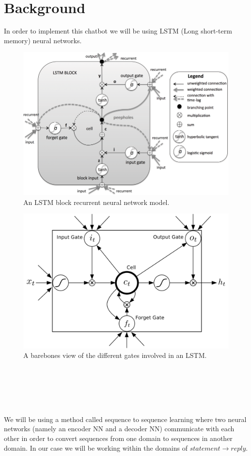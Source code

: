 \documentclass[titlepage]{article}
\newcommand\tab[1][1cm]{\hspace*{#1}}
\begin{document}
\section{Background}
In order to implement this chatbot we will be using LSTM (Long short-term memory) neural networks.
\begin{figure}[H]
	\centering
	\includegraphics[width=120mm]{LSTM-model.png}
	\caption{An LSTM block recurrent neural network model.}
	\label{fig:lstm1}
\end{figure}
\begin{figure}[H]
	\centering
	\includegraphics[width=120mm]{LSTM-model-2.png}
	\caption{A barebones view of the different gates involved in an LSTM.}
	\label{fig:lstm2}
\end{figure}
~\\~\\~\\~\\~\\	
\tab We will be using a method called sequence to sequence learning where two neural networks (namely an encoder NN and a decoder NN) communicate with each other in order to convert sequences from one domain to sequences in another domain. In our case we will be working within the domains of $statement\rightarrow reply$.
\end{document}
